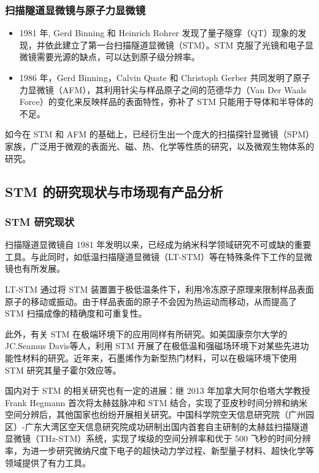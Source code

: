 \documentclass{article}
\begin{document}
\subsubsection[扫描隧道显微镜与原子力显微镜]{扫描隧道显微镜与原子力显微镜}
\begin{itemize}
	\item 1981 年, Gerd Binning 和 Heinrich Rohrer 发现了量子隧穿（QT）现象的发现，并依此建立了第一台扫描隧道显微镜（STM）。STM 克服了光镜和电子显微镜需要光源的缺点，可以达到原子级分辨率。
	\item 1986 年，Gerd Binning，Calvin Quate 和 Christoph Gerber 共同发明了原子力显微镜（AFM），其利用针尖与样品原子之间的范德华力（Van Der Waals Force）的变化来反映样品的表面特性，弥补了 STM 只能用于导体和半导体的不足。
\end{itemize}

如今在 STM 和 AFM 的基础上，已经衍生出一个庞大的扫描探针显微镜（SPM）家族，广泛用于微观的表面光、磁、热、化学等性质的研究，以及微观生物体系的研究。

\subsection{STM 的研究现状与市场现有产品分析}
\subsubsection[STM 研究现状]{STM 研究现状}
扫描隧道显微镜自 1981 年发明以来，已经成为纳米科学领域研究不可或缺的重要工具。与此同时，如低温扫描隧道显微镜（LT-STM）等在特殊条件下工作的显微镜也有所发展\cite{ref5,ref6,ref7}。

LT-STM 通过将 STM 装置置于极低温条件下，利用冷冻原子原理来限制样品表面原子的移动或振动。由于样品表面的原子不会因为热运动而移动，从而提高了 STM
扫描成像的精确度和可重复性\cite{ref8}。

此外，有关 STM 在极端环境下的应用同样有所研究\cite{ref1,ref2,ref3}。如美国康奈尔大学的 JC.Seamus Davis等人\cite{ref4}，利用 STM 开展了在极低温和强磁场环境下对某些先进功能性材料的研究。近年来，石墨烯作为新型热门材料，可以在极端环境下使用 STM 研究其量子霍尔效应等。

国内对于 STM 的相关研究也有一定的进展：继 2013 年加拿大阿尔伯塔大学教授 Frank Hegmann 首次将太赫兹脉冲和 STM 结合，实现了亚皮秒时间分辨和纳米空间分辨后，其他国家也纷纷开展相关研究。中国科学院空天信息研究院（广州园区）-广东大湾区空天信息研究院成功研制出国内首套自主研制的太赫兹扫描隧道显微镜（THz-STM）系统，实现了埃级的空间分辨率和优于 500 飞秒的时间分辨率，为进一步研究微纳尺度下电子的超快动力学过程、新型量子材料、超快化学等领域提供了有力工具\cite{ref9}。
\end{document}
